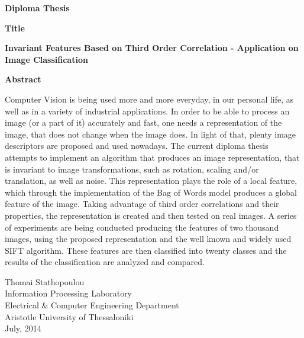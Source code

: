 {\selectfont 

\begin{center}
\centering
\textbf{\Large{Diploma Thesis}}

\vspace{1cm}

\textbf{\Large{Title}}

\vspace{0.5cm}

\textbf{\large{Invariant Features Based on Third Order Correlation - Application on Image Classification}}

\vspace{1cm}

\centering
\textbf{Abstract}
\end{center}

Computer Vision is being used more and more everyday, in our personal life, as well as in a variety of industrial applications. In order to be able to process an image (or a part of it) accurately and fast, one needs a representation of the image, that does not change when the image does. In light of that, plenty image descriptors are proposed and used nowadays. The current diploma thesis attempts to implement an algorithm that produces an image representation, that is invariant to image transformations, such as rotation, scaling and/or translation, as well as noise. This representation plays the role of a local feature, which through the implementation of the Bag of Words model produces a global feature of the image. Taking advantage of third order correlations and their properties, the representation is created and then tested on real images.  A series of experiments are being conducted producing the features of two thousand images, using the proposed representation and the well known and widely used SIFT algorithm. These features are then classified into twenty classes and the results of the classification are analyzed and compared.

\vspace{1.5cm}

\begin{flushright}
Thomai Stathopoulou\\
Information Processing Laboratory\\
Electrical \& Computer Engineering Department\\
Aristotle University of Thessaloniki\\
July, 2014
\end{flushright}
}